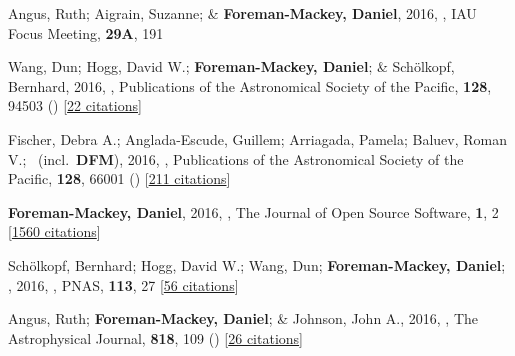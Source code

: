 \item[{\color{numcolor}\scriptsize20}] Angus, Ruth; Aigrain, Suzanne; \& \textbf{Foreman-Mackey, Daniel}, 2016, , IAU Focus Meeting, \textbf{29A}, 191

\item[{\color{numcolor}\scriptsize19}] Wang, Dun; Hogg, David W.; \textbf{Foreman-Mackey, Daniel}; \& Sch{\"o}lkopf, Bernhard, 2016, , Publications of the Astronomical Society of the Pacific, \textbf{128}, 94503 () [\href{https://ui.adsabs.harvard.edu/abs/2016PASP..128i4503W}{22 citations}]

\item[{\color{numcolor}\scriptsize18}] Fischer, Debra A.; Anglada-Escude, Guillem; Arriagada, Pamela; Baluev, Roman V.; \etal\ (incl.\ \textbf{DFM}), 2016, , Publications of the Astronomical Society of the Pacific, \textbf{128}, 66001 () [\href{https://ui.adsabs.harvard.edu/abs/2016PASP..128f6001F}{211 citations}]

\item[{\color{numcolor}\scriptsize17}] \textbf{Foreman-Mackey, Daniel}, 2016, , The Journal of Open Source Software, \textbf{1}, 2 [\href{https://scholar.google.com/scholar?cites=1835087844145558435,17325274697099535179,14220488595059618709,12820425635803494730,7284810048757141243,17415935839493019063}{1560 citations}]

\item[{\color{numcolor}\scriptsize16}] Sch{\"o}lkopf, Bernhard; Hogg, David W.; Wang, Dun; \textbf{Foreman-Mackey, Daniel}; \etal, 2016, , PNAS, \textbf{113}, 27 [\href{https://scholar.google.com/scholar?cites=2429561747341807338}{56 citations}]

\item[{\color{numcolor}\scriptsize15}] Angus, Ruth; \textbf{Foreman-Mackey, Daniel}; \& Johnson, John A., 2016, , The Astrophysical Journal, \textbf{818}, 109 () [\href{https://ui.adsabs.harvard.edu/abs/2016ApJ...818..109A}{26 citations}]

